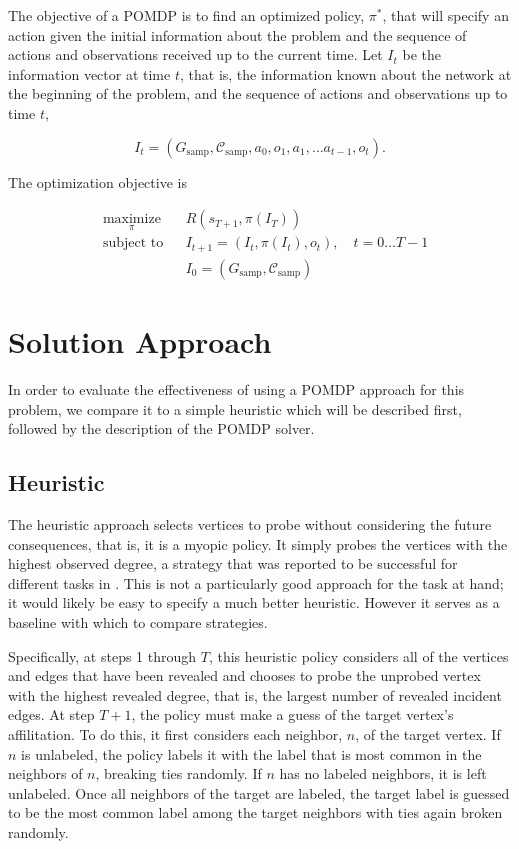 \documentclass{IEEEtran}
\newcommand{\Gs}{\ensuremath{G_\text{samp}}}
\newcommand{\Coms}{\ensuremath{\mathcal{C}_\text{samp}}}
\begin{document}
The objective of a POMDP is to find an optimized policy, $\pi^*$, that will specify an action given the initial information about the problem and the sequence of actions and observations received up to the current time. Let $I_t$ be the information vector at time $t$, that is, the information known about the network at the beginning of the problem, and the sequence of actions and observations up to time $t$,

\begin{equation}
    I_t = (\Gs, \Coms, a_0, o_1, a_1, \dots a_{t-1}, o_t) \text{.}
\end{equation}

The optimization objective is

\begin{equation*}
\begin{aligned}
& \underset{\pi}{\text{maximize}}
& & R \left( s_{T+1}, \pi(I_{T}) \right) \\
& \text{subject to}
& & I_{t+1} = (I_t, \pi(I_t), o_t), \quad t = 0 \dots T-1 \\
& & & I_0 = (\Gs, \Coms)
\end{aligned}
\end{equation*}

\section{Solution Approach}

In order to evaluate the effectiveness of using a POMDP approach for this problem, we compare it to a simple heuristic which will be described first, followed by the description of the POMDP solver. 

\subsection{Heuristic} \label{sec:heuristic}

The heuristic approach selects vertices to probe without considering the future consequences, that is, it is a myopic policy. It simply probes the vertices with the highest observed degree, a strategy that was reported to be successful for different tasks in \cite{Soundarajan2014}. This is not a particularly good approach for the task at hand; it would likely be easy to specify a much better heuristic. However it serves as a baseline with which to compare strategies.

Specifically, at steps 1 through $T$, this heuristic policy considers all of the vertices and edges that have been revealed and chooses to probe the unprobed vertex with the highest revealed degree, that is, the largest number of revealed incident edges. At step $T+1$, the policy must make a guess of the target vertex's affilitation. To do this, it first considers each neighbor, $n$, of the target vertex. If $n$ is unlabeled, the policy labels it with the label that is most common in the neighbors of $n$, breaking ties randomly. If $n$ has no labeled neighbors, it is left unlabeled. Once all neighbors of the target are labeled, the target label is guessed to be the most common label among the target neighbors with ties again broken randomly.
\end{document}
